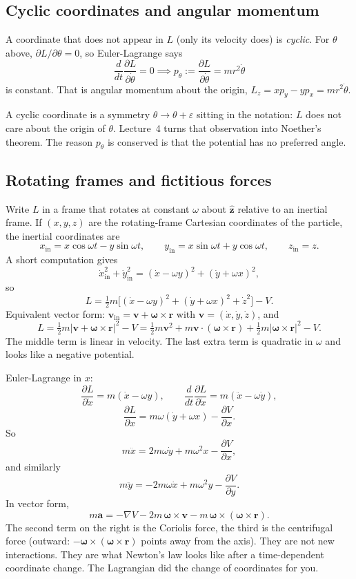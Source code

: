 \documentclass[11pt]{article}
\numberwithin{equation}{section}
\newcommand{\ddt}{\frac{d}{dt}}
\newcommand{\pd}[2]{\frac{\partial #1}{\partial #2}}
\newcommand{\vect}[1]{\mathbf{#1}}
\begin{document}
\subsection{Cyclic coordinates and angular momentum}

A coordinate that does not appear in $L$ (only its velocity does) is \emph{cyclic}. For $\theta$ above, $\partial L/\partial\theta=0$, so Euler-Lagrange says
\[
\ddt\pd{L}{\dot\theta} = 0
\implies
p_\theta := \pd{L}{\dot\theta} = m r^2\dot\theta
\]
is constant. That is angular momentum about the origin, $L_z=x p_y-y p_x=m r^2\dot\theta$.

A cyclic coordinate is a symmetry $\theta\to\theta+\varepsilon$ sitting in the notation: $L$ does not care about the origin of $\theta$. Lecture~4 turns that observation into Noether's theorem. The reason $p_\theta$ is conserved is that the potential has no preferred angle.

\subsection{Rotating frames and fictitious forces}

Write $L$ in a frame that rotates at constant $\omega$ about $\hat{\vect{z}}$ relative to an inertial frame. If $(x,y,z)$ are the rotating-frame Cartesian coordinates of the particle, the inertial coordinates are
\[
x_{\mathrm{in}} = x\cos\omega t - y\sin\omega t,\qquad
y_{\mathrm{in}} = x\sin\omega t + y\cos\omega t,\qquad
z_{\mathrm{in}}=z.
\]
A short computation gives
\[
\dot x_{\mathrm{in}}^2 + \dot y_{\mathrm{in}}^2
= (\dot x-\omega y)^2 + (\dot y+\omega x)^2,
\]
so
\[
L = \tfrac12 m\bigl[(\dot x-\omega y)^2 + (\dot y+\omega x)^2 + \dot z^2\bigr] - V.
\]
Equivalent vector form: $\vect{v}_{\mathrm{in}}=\vect{v}+\vect{\omega}\times\vect{r}$ with $\vect{v}=(\dot x,\dot y,\dot z)$, and
\[
L = \tfrac12 m\bigl|\vect{v}+\vect{\omega}\times\vect{r}\bigr|^2 - V
= \tfrac12 m\vect{v}^2 + m\vect{v}\cdot(\vect{\omega}\times\vect{r}) + \tfrac12 m|\vect{\omega}\times\vect{r}|^2 - V.
\]
The middle term is linear in velocity. The last extra term is quadratic in $\omega$ and looks like a negative potential.

Euler-Lagrange in $x$:
\[
\pd{L}{\dot x} = m(\dot x-\omega y),\qquad
\ddt\pd{L}{\dot x} = m(\ddot x-\omega\dot y),
\]
\[
\pd{L}{x} = m\omega(\dot y+\omega x) - \pd{V}{x}.
\]
So
\[
m\ddot x = 2m\omega\dot y + m\omega^2 x - \pd{V}{x},
\]
and similarly
\[
m\ddot y = -2m\omega\dot x + m\omega^2 y - \pd{V}{y}.
\]
In vector form,
\[
m\vect{a}
= -\nabla V
- 2m\,\vect{\omega}\times\vect{v}
- m\,\vect{\omega}\times(\vect{\omega}\times\vect{r}).
\]
The second term on the right is the Coriolis force, the third is the centrifugal force (outward: $-\vect{\omega}\times(\vect{\omega}\times\vect{r})$ points away from the axis). They are not new interactions. They are what Newton's law looks like after a time-dependent coordinate change. The Lagrangian did the change of coordinates for you.
\end{document}
